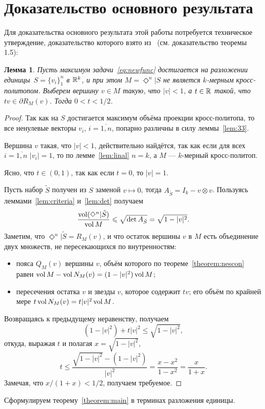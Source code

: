 \documentclass[a4paper,12pt]{article}
\def\vol{\mathop{\rm vol}}
\newcommand{\crosp}{\Diamond}
\newtheorem{lem}{Лемма}[section]
\numberwithin{equation}{section}
\begin{document}
	\section{Доказательство основного результата}
	Для доказательства основного результата этой работы потребуется техническое утверждение, доказательство которого взято из~\cite{crospol} (см. доказательство теоремы 1.5):
	\begin{lem}\label{lem:ineq}
		Пусть максимум задачи~\eqref{eq:newfunc} достигается на разложении единицы~$S=\{v_i\}_1^n$ в $\mathbb {R}^k$,  и при этом $M=\crosp^n|S$ не является $k$-мерным кросс-политопом. Выберем вершину $v\in M$ такую, что $|v|<1$, а $t\in\mathbb {R}$ такой, что $tv\in\partial R_M(v)$. Тогда $0<t<1/2$.
	\end{lem}
	\begin{proof}
		Так как на $S$ достигается максимум объёма проекции кросс-политопа, то все ненулевые векторы $v_i$, $i=\overline{1,n}$, попарно различны в силу леммы~\ref{lem:33}.

		Вершина $v$ такая, что $|v|<1$, действительно найдётся, так как если для всех $i=\overline{1,n}$ $|v_i|=1$, то по лемме~\ref{lem:linal} $n=k$, а $M$ --- $k$-мерный кросс-политоп.

		Ясно, что $t\in(0,1)$, так как если $t=0$, то $|v|=1$.

		Пусть набор $\tilde{S}$ получен из $S$ заменой $v\mapsto 0$, тогда $A_{\tilde{S}}=I_k-v\otimes v$. Пользуясь леммами~\ref{lem:criteria} и~\ref{lem:det} получаем
			$$\frac{\vol(\crosp^n|\tilde{S})}{\vol M}\leqslant\sqrt{\det A_{\tilde{S}}}=\sqrt{1-|v|^2}.$$
		Заметим, что $\crosp^n|\tilde{S}=R_M(v)$, и что остаток вершины $v$ в $M$ есть объединение двух множеств, не пересекающихся по внутренностям:	
			\begin{itemize}
				\item пояса $Q_M(v)$ вершины $v$, объём которого по теореме~\ref{theorem:nescon} равен $\vol M-\vol N_M(v)=(1-|v|^2)\vol M$;
				\item пересечения остатка $v$ и звезды $v$, которое содержит $tv$; его объём по крайней мере $t\vol N_M(v)=t|v|^2\vol M$.  
			\end{itemize}
		Возвращаясь к предыдущему неравенству, получаем
			$$(1-|v|^2)+t|v|^2\leqslant\sqrt{1-|v|^2},$$
		откуда, выражая $t$ и полагая $x=\sqrt{1-|v|^2}$,
			$$t\leqslant\frac{\sqrt{1-|v|^2}-(1-|v|^2)}{|v|^2}=\frac{x-x^2}{1-x^2}=\frac{x}{1+x}.$$
		Замечая, что $x/(1+x)<1/2$, получаем требуемое.
	\end{proof}
	Сформулируем теорему~\ref{theorem:main} в терминах разложения единицы.
\end{document}
